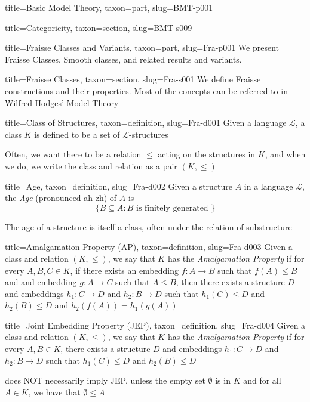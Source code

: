 \documentclass[a4paper]{article}
\begin{document}
\begin{tree}{title={Basic Model Theory}, taxon={part}, slug={BMT-p001}}
\begin{tree}{title={Categoricity}, taxon={section}, slug={BMT-s009}}
\end{tree}


\end{tree}


  
  
\begin{tree}{title={Fraisse Classes and Variants}, taxon={part}, slug={Fra-p001}}
We present Fraisse Classes, Smooth classes, and related results and variants.
\begin{tree}{title={Fraisse Classes}, taxon={section}, slug={Fra-s001}}
We define Fraisse constructions and their properties. Most of the concepts can be referred to in Wilfred Hodges' Model Theory~\cite{Ref-0001}
\begin{tree}{title={Class of Structures}, taxon={definition}, slug={Fra-d001}}
Given a language \(\mathcal {L}\), a class \(K\) is defined to be a set of \(\mathcal {L}\)-structures\par{Often, we want there to be a relation \(\leq\) acting on the structures in \(K\), and when we do, we write the class and relation as a pair \((K,  \leq )\)}
\end{tree}

\begin{tree}{title={Age}, taxon={definition}, slug={Fra-d002}}
Given a structure \(A\) in a language \(\mathcal {L}\), the \emph{Age} (pronounced ah-zh) of \(A\) is \[\{ B \subseteq  A: B  \text { is finitely generated } \}\]\par{The age of a structure is itself a class, often under the relation of substructure}
\end{tree}

\begin{tree}{title={Amalgamation Property (AP)}, taxon={definition}, slug={Fra-d003}}
Given a class and relation \((K, \leq )\), we say that \(K\) has the \emph{Amalgamation Property} if for every \(A,B,C  \in  K\), if there 
exists an embedding \(f:A \rightarrow  B\) such that \(f(A)  \leq  B\) and and embedding \(g:A \rightarrow  C\) such that \(A \leq  B\), then there exists a structure \(D\) 
and embeddings \(h_1:C \rightarrow  D\) and \(h_2:B \rightarrow  D\) such that \(h_1(C) \leq  D\) and \(h_2(B)  \leq  D\) and \(h_2(f(A)) = h_1(g(A))\)
\end{tree}

\begin{tree}{title={Joint Embedding Property (JEP)}, taxon={definition}, slug={Fra-d004}}
Given a class and relation \((K, \leq )\), we say that \(K\) has the \emph{Amalgamation Property} if for every \(A,B  \in  K\), there exists a structure \(D\) 
and embeddings \(h_1:C \rightarrow  D\) and \(h_2:B \rightarrow  D\) such that \(h_1(C) \leq  D\) and \(h_2(B)  \leq  D\)\par{ does NOT necessarily imply JEP, unless the empty set \(\emptyset\) is in \(K\) and for all \(A \in  K\), we have that \(\emptyset   \leq  A\)}
\end{tree}


\end{tree}
\end{tree}
\end{document}
